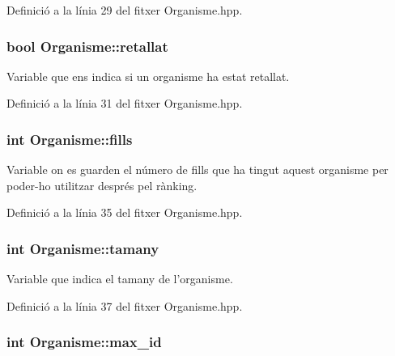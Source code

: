 Definició a la línia 29 del fitxer Organisme.\-hpp.

\hypertarget{class_organisme_acf912225a83570cb68542dcc6709023a}{
\subsubsection[{retallat}]{\setlength{\rightskip}{0pt plus 5cm}bool Organisme\-::retallat\hspace{0.3cm}{\ttfamily [private]}}}\label{class_organisme_acf912225a83570cb68542dcc6709023a}


Variable que ens indica si un organisme ha estat retallat. 



Definició a la línia 31 del fitxer Organisme.\-hpp.

\hypertarget{class_organisme_a4644da413bb0e38f34566334ebee1c1c}{
\subsubsection[{fills}]{\setlength{\rightskip}{0pt plus 5cm}int Organisme\-::fills\hspace{0.3cm}{\ttfamily [private]}}}\label{class_organisme_a4644da413bb0e38f34566334ebee1c1c}


Variable on es guarden el número de fills que ha tingut aquest organisme per poder-\/ho utilitzar després pel rànking. 



Definició a la línia 35 del fitxer Organisme.\-hpp.

\hypertarget{class_organisme_a5d30992b5ded1a9314aff94ce9fb3932}{
\subsubsection[{tamany}]{\setlength{\rightskip}{0pt plus 5cm}int Organisme\-::tamany\hspace{0.3cm}{\ttfamily [private]}}}\label{class_organisme_a5d30992b5ded1a9314aff94ce9fb3932}


Variable que indica el tamany de l'organisme. 



Definició a la línia 37 del fitxer Organisme.\-hpp.

\hypertarget{class_organisme_ae7f51a74f01cee155cf88a5b01545f78}{
\subsubsection[{max\-\_\-id}]{\setlength{\rightskip}{0pt plus 5cm}int Organisme\-::max\-\_\-id\hspace{0.3cm}{\ttfamily [private]}}}\label{class_organisme_ae7f51a74f01cee155cf88a5b01545f78}


